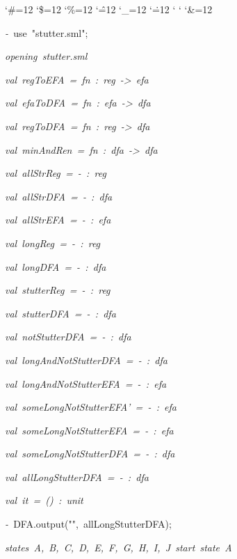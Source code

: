 \begin{list}{}
{\setlength{\leftmargin}{\leftmargini}
\setlength{\rightmargin}{0cm}
\setlength{\itemindent}{0cm}
\setlength{\listparindent}{0cm}
\setlength{\itemsep}{0cm}
\setlength{\parsep}{0cm}
\setlength{\labelsep}{0cm}
\setlength{\labelwidth}{0cm}
\catcode`\#=12
\catcode`\$=12
\catcode`\%=12
\catcode`\^=12
\catcode`\_=12
\catcode`\.=12
\catcode`
\catcode`
\catcode`\&=12
\ttfamily}
\small
\item[]\textsl{-\ }use\ "stutter.sml";
\item[]\textsl{opening\ stutter.sml}
\item[]\textsl{val\ regToEFA\ =\ fn\ :\ reg\ ->\ efa}
\item[]\textsl{val\ efaToDFA\ =\ fn\ :\ efa\ ->\ dfa}
\item[]\textsl{val\ regToDFA\ =\ fn\ :\ reg\ ->\ dfa}
\item[]\textsl{val\ minAndRen\ =\ fn\ :\ dfa\ ->\ dfa}
\item[]\textsl{val\ allStrReg\ =\ -\ :\ reg}
\item[]\textsl{val\ allStrDFA\ =\ -\ :\ dfa}
\item[]\textsl{val\ allStrEFA\ =\ -\ :\ efa}
\item[]\textsl{val\ longReg\ =\ -\ :\ reg}
\item[]\textsl{val\ longDFA\ =\ -\ :\ dfa}
\item[]\textsl{val\ stutterReg\ =\ -\ :\ reg}
\item[]\textsl{val\ stutterDFA\ =\ -\ :\ dfa}
\item[]\textsl{val\ notStutterDFA\ =\ -\ :\ dfa}
\item[]\textsl{val\ longAndNotStutterDFA\ =\ -\ :\ dfa}
\item[]\textsl{val\ longAndNotStutterEFA\ =\ -\ :\ efa}
\item[]\textsl{val\ someLongNotStutterEFA'\ =\ -\ :\ efa}
\item[]\textsl{val\ someLongNotStutterEFA\ =\ -\ :\ efa}
\item[]\textsl{val\ someLongNotStutterDFA\ =\ -\ :\ dfa}
\item[]\textsl{val\ allLongStutterDFA\ =\ -\ :\ dfa}
\item[]\textsl{val\ it\ =\ ()\ :\ unit}
\item[]\textsl{-\ }DFA.output("",\ allLongStutterDFA);
\item[]\textsl{states\ A,\ B,\ C,\ D,\ E,\ F,\ G,\ H,\ I,\ J\ start\ state\ A}

\end{list}
